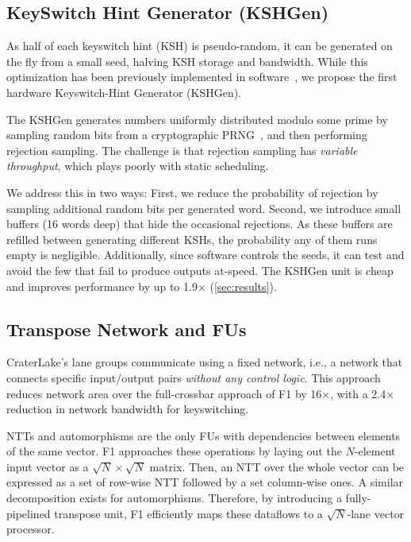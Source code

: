 \subsection{KeySwitch Hint Generator (KSHGen)}
\label{sec:prg}
As half of each keyswitch hint (KSH) is pseudo-random, it can be generated on
the fly from a small seed, halving KSH storage and bandwidth. While this
optimization has been previously implemented in
software~\cite{halevi:2020:design}, we propose the first hardware
Keyswitch-Hint Generator (KSHGen).

The KSHGen generates numbers uniformly distributed modulo some prime by
sampling random bits from a cryptographic
PRNG~\cite{bertoni:2018:kangarootwelve}, and then performing rejection
sampling. The challenge is that rejection sampling has \emph{variable
throughput}, which plays poorly with static scheduling.

We address this in two ways: First, we reduce the probability of rejection by
sampling additional random bits per generated word. Second, we introduce small
buffers (16 words deep) that hide the occasional rejections. As these buffers
are refilled between generating different KSHs, the probability any of them
runs empty is negligible. Additionally, since software controls the seeds, it
can test and avoid the few that fail to produce outputs at-speed.
%
The KSHGen unit is cheap and improves performance by up to 1.9$\times$
(\autoref{sec:results}).

\subsection{Transpose Network and FUs}\label{sec:network}

CraterLake's lane groups communicate using a fixed network, i.e., a network
that connects specific input/output pairs \emph{without any control logic}.
This approach reduces network area over the full-crossbar approach of F1 by
16$\times$, with a 2.4$\times$ reduction in network bandwidth for keyswitching.

NTTs and automorphisms are the only FUs with dependencies between elements of
the same vector. F1 approaches these operations by laying out the $N$-element
input vector as a $\sqrt N \times \sqrt N$ matrix. Then, an NTT over the whole
vector can be expressed as a set of row-wise NTT followed by a set column-wise
ones. A similar decomposition exists for automorphisms. Therefore, by
introducing a fully-pipelined transpose unit, F1 efficiently maps these
dataflows to a $\sqrt N$-lane vector processor.

